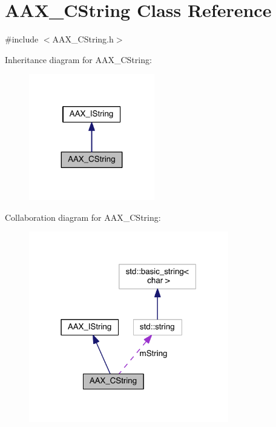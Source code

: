 \hypertarget{a00042}{}\section{A\+A\+X\+\_\+\+C\+String Class Reference}
\label{a00042}


{\ttfamily \#include $<$A\+A\+X\+\_\+\+C\+String.\+h$>$}



Inheritance diagram for A\+A\+X\+\_\+\+C\+String\+:
\nopagebreak
\begin{figure}[H]
\begin{center}
\leavevmode
\includegraphics[width=155pt]{a00473}
\end{center}
\end{figure}


Collaboration diagram for A\+A\+X\+\_\+\+C\+String\+:
\nopagebreak
\begin{figure}[H]
\begin{center}
\leavevmode
\includegraphics[width=247pt]{a00474}
\end{center}
\end{figure}


